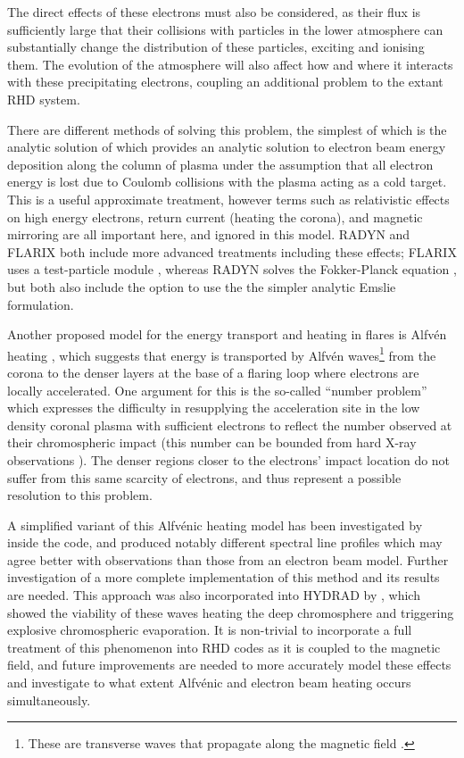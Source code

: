 The direct effects of these electrons must also be considered, as their flux is sufficiently large that their collisions with particles in the lower atmosphere can substantially change the distribution of these particles, exciting and ionising them.
The evolution of the atmosphere will also affect how and where it interacts with these precipitating electrons, coupling an additional problem to the extant RHD system.

There are different methods of solving this problem, the simplest of which is the analytic solution of \citet{Emslie1978} which provides an analytic solution to electron beam energy deposition along the column of plasma under the assumption that all electron energy is lost due to Coulomb collisions with the plasma acting as a cold target.
This is a useful approximate treatment, however terms such as relativistic effects on high energy electrons, return current (heating the corona), and magnetic mirroring are all important here, and ignored in this model. RADYN and FLARIX both include more advanced treatments including these effects; FLARIX uses a test-particle module \citep{Varady2010}, whereas RADYN solves the Fokker-Planck equation \citep[now using the method of ][]{Allred2020}, but both also include the option to use the the simpler analytic Emslie formulation.

Another proposed model for the energy transport and heating in flares is Alfvén heating \citep{Emslie1982, Fletcher2007}, which suggests that energy is transported by Alfvén waves\footnote{These  are transverse waves that propagate along the magnetic field \citep[e.g. ][]{TandbergHanssen1988}.} from the corona to the denser layers at the base of a flaring loop where electrons are locally accelerated.
One argument for this is the so-called ``number problem'' which expresses the difficulty in resupplying the acceleration site in the low density coronal plasma with sufficient electrons to reflect the number observed at their chromospheric impact (this number can be bounded from hard X-ray observations \citep[e.g.][]{Simoes2013}).
The denser regions closer to the electrons' impact location do not suffer from this same scarcity of electrons, and thus represent a possible resolution to this problem.

A simplified variant of this Alfvénic heating model has been investigated by \citet{Kerr2016} inside the \Radyn{} code, and produced notably different spectral line profiles which may agree better with observations than those from an electron beam model.
Further investigation of a more complete implementation of this method and its results are needed.
This approach was also incorporated into HYDRAD by \citet{Reep2016}, which showed the viability of these waves heating the deep chromosphere and triggering explosive chromospheric evaporation.
It is non-trivial to incorporate a full treatment of this phenomenon into RHD codes as it is coupled to the magnetic field, and future improvements are needed to more accurately model these effects and investigate to what extent Alfvénic and electron beam heating occurs simultaneously.

